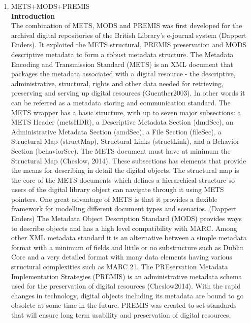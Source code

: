 \begin{enumerate}
	\item METS+MODS+PREMIS\\
	{\bf Introduction}\\
	The combination of METS, MODS and PREMIS was first developed for the archival digital repositories of the British Library's e-journal system (Dappert Enders). It exploited the METS structural, PREMIS preservation and MODS descriptive metadata to form a robust metadata structure. 
	The Metadata Encoding and Transmission Standard (METS) is an XML document that packages the metadata associated with a digital resource - the descriptive, administrative, structural, rights and other data needed for retrieving, preserving and serving up digital resources (Guenther2003). In other words it can be referred as a metadata storing and communication standard. The METS wrapper has a basic structure, with up to seven major subsections: a METS Header (metsHDR), a Descriptive Metadata Section (dmdSec), an Administrative Metadata Section (amdSec), a File Section (fileSec), a Structural Map (structMap), Structural Links (structLink), and a Behavior Section (behaviorSec). The METS document must have at minimum the Structural Map (Cheslow, 2014). These subsections has elements that provide the means for describing in detail the digital objects. The structural map is the core of the METS documents which defines a hierarchical structure so users of the digital library object can navigate through it using METS pointers. One great advantage of METS is that it provides a flexible framework for modelling different document types and scenarios. (Dappert Enders)
	The Metadata Object Description Standard (MODS) provides ways to describe objects and has a high level compatibility with MARC. Among other XML metadata standard it is an alternative between a simple metadata format with a minimum of fields and little or no substructure such as Dublin Core and a very detailed format with many data elements having various structural complexities such as MARC 21. 
	The PREservation Metadata Implementation Strategies (PREMIS) is an administrative metadata schema used for the preservation of digital resources (Cheslow2014). With the rapid changes in technology, digital objects including its metadata are bound to go obsolete at some time in the future. PREMIS was created to set standards that will ensure long term usability and preservation of digital resources.
	

\end{enumerate}
